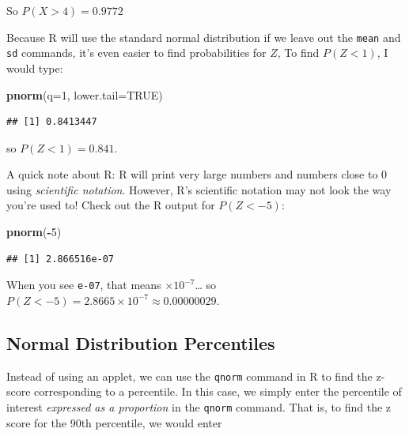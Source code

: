 \documentclass[
]{book}
\newenvironment{Shaded}{\begin{snugshade}}{\end{snugshade}}
\newcommand{\AttributeTok}[1]{\textcolor[rgb]{0.13,0.29,0.53}{#1}}
\newcommand{\ConstantTok}[1]{\textcolor[rgb]{0.56,0.35,0.01}{#1}}
\newcommand{\DecValTok}[1]{\textcolor[rgb]{0.00,0.00,0.81}{#1}}
\newcommand{\FunctionTok}[1]{\textcolor[rgb]{0.13,0.29,0.53}{\textbf{#1}}}
\newcommand{\NormalTok}[1]{#1}
\newcommand{\SpecialCharTok}[1]{\textcolor[rgb]{0.81,0.36,0.00}{\textbf{#1}}}
\begin{document}
So \(P(X > 4) = 0.9772\)

Because R will use the standard normal distribution if we leave out the \texttt{mean} and \texttt{sd} commands, it's even easier to find probabilities for \(Z\), To find \(P(Z<1)\), I would type:

\begin{Shaded}
\begin{Highlighting}[]
\FunctionTok{pnorm}\NormalTok{(}\AttributeTok{q=}\DecValTok{1}\NormalTok{, }\AttributeTok{lower.tail=}\ConstantTok{TRUE}\NormalTok{)}
\end{Highlighting}
\end{Shaded}

\begin{verbatim}
## [1] 0.8413447
\end{verbatim}

so \(P(Z < 1) = 0.841\).

A quick note about R: R will print very large numbers and numbers close to 0 using \emph{scientific notation}. However, R's scientific notation may not look the way you're used to! Check out the R output for \(P(Z < -5)\):

\begin{Shaded}
\begin{Highlighting}[]
\FunctionTok{pnorm}\NormalTok{(}\SpecialCharTok{{-}}\DecValTok{5}\NormalTok{)}
\end{Highlighting}
\end{Shaded}

\begin{verbatim}
## [1] 2.866516e-07
\end{verbatim}

When you see \texttt{e-07}, that means \(\times10^{-7}\)\ldots{} so \(P(Z < -5) = 2.8665 \times 10^{-7} \approx 0.00000029\).

\subsection*{Normal Distribution Percentiles}\label{normal-distribution-percentiles}

Instead of using an applet, we can use the \texttt{qnorm} command in R to find the z-score corresponding to a percentile. In this case, we simply enter the percentile of interest \emph{expressed as a proportion} in the \texttt{qnorm} command. That is, to find the z score for the 90th percentile, we would enter
\end{document}
